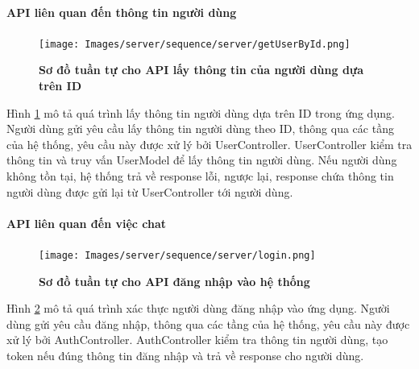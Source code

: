 



\paragraph{API liên quan đến thông tin người dùng}
\mbox{}

\begin{figure}[H]
  \centering
  \texttt{[image: Images/server/sequence/server/getUserById.png]}
  \caption[Sơ đồ tuần tự cho API lấy thông tin của người dùng dựa trên ID ]{\bfseries \fontsize{12pt}{0pt}
  \selectfont Sơ đồ tuần tự cho API lấy thông tin của người dùng dựa trên ID }
  \label{getUserById} %
\end{figure}
Hình \ref{getUserById} mô tả quá trình lấy thông tin người dùng dựa trên ID trong ứng dụng. Người dùng gửi yêu cầu lấy thông tin người dùng theo ID, thông qua các tầng của hệ thống, yêu cầu này được xử lý bởi UserController. UserController kiểm tra thông tin và truy vấn UserModel để lấy thông tin người dùng. Nếu người dùng không tồn tại, hệ thống trả về response lỗi, ngược lại, response chứa thông tin người dùng được gửi lại từ UserController tới người dùng.







\paragraph{API liên quan đến việc chat}
\mbox{}

\begin{figure}[H]
  \centering
  \texttt{[image: Images/server/sequence/server/login.png]}
  \caption[Sơ đồ tuần tự cho API đăng nhập vào hệ thống]{\bfseries \fontsize{12pt}{0pt}
  \selectfont Sơ đồ tuần tự cho API đăng nhập vào hệ thống }
  \label{backend_login} %
\end{figure}
Hình \ref{backend_login}  mô tả quá trình xác thực người dùng đăng nhập vào ứng dụng. Người dùng gửi yêu cầu đăng nhập, thông qua các tầng của hệ thống, yêu cầu này được xử lý bởi AuthController. AuthController kiểm tra thông tin người dùng, tạo token nếu đúng thông tin đăng nhập và trả về response cho người dùng.

